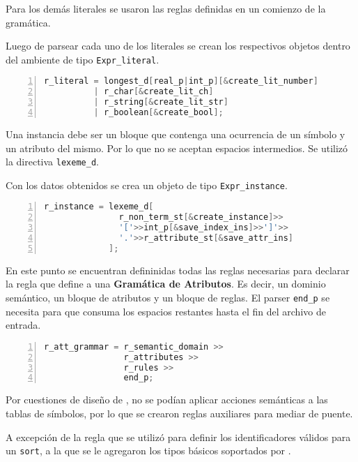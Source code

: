 Para los demás literales se usaron las reglas definidas en un comienzo de la gramática.

Luego de parsear cada uno de los literales se crean los respectivos objetos dentro del ambiente de tipo \texttt{Expr\_literal}.

\begin{lstlisting}[language=C++, basicstyle=\scriptsize, numbers=left, numbersep=5pt, numberstyle=\tiny]
r_literal = longest_d[real_p|int_p][&create_lit_number]
          | r_char[&create_lit_ch]
          | r_string[&create_lit_str]
          | r_boolean[&create_bool];
\end{lstlisting}

Una instancia debe ser un bloque que contenga una ocurrencia de un símbolo y un atributo del mismo. Por lo que no se aceptan espacios intermedios. Se utilizó la directiva \texttt{lexeme\_d}.

Con los datos obtenidos se crea un objeto de tipo \texttt{Expr\_instance}.

\begin{lstlisting}[language=C++, basicstyle=\scriptsize, numbers=left, numbersep=5pt, numberstyle=\tiny]
r_instance = lexeme_d[
               r_non_term_st[&create_instance]>>
               '['>>int_p[&save_index_ins]>>']'>>
               '.'>>r_attribute_st[&save_attr_ins]
             ];
\end{lstlisting}

En este punto se encuentran defininidas todas las reglas necesarias para declarar la regla que define a una \textbf{Gramática de Atributos}. Es decir, un dominio semántico, un bloque de atributos y un bloque de reglas. El parser \texttt{end\_p} se necesita para que consuma los espacios restantes hasta el fin del archivo de entrada.

\begin{lstlisting}[language=C++, basicstyle=\scriptsize, numbers=left, numbersep=5pt, numberstyle=\tiny]
r_att_grammar = r_semantic_domain >>
                r_attributes >>
                r_rules >>
                end_p;
\end{lstlisting}

Por cuestiones de diseño de \spirit, no se podían aplicar acciones semánticas a las tablas de símbolos, por lo que se crearon reglas auxiliares para mediar de puente.

A excepción de la regla que se utilizó para definir los identificadores válidos para un \texttt{sort}, a la que se le agregaron los tipos básicos soportados por \maggen.

